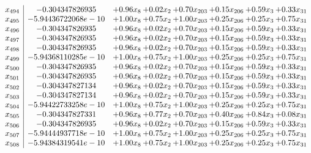 \documentclass[8pt]{article}
\begin{document}
\[\begin{array}{c| c c@{\hskip 2pt} c@{\hskip 2pt} c@{\hskip 2pt} c@{\hskip 2pt} c@{\hskip 2pt} c@{\hskip 2pt} }
 x_{494}   &  -0.304347826935 & +  0.96 x_{8} & +  0.02 x_{2} & +  0.70 x_{203} & +  0.15 x_{206} & +  0.59 x_{3} & +  0.33 x_{31}\\
 x_{495}   &  -5.94436722068e-10 & +  1.00 x_{8} & +  0.75 x_{2} & +  1.00 x_{203} & +  0.25 x_{206} & +  0.25 x_{3} & +  0.75 x_{31}\\
 x_{496}   &  -0.304347826935 & +  0.96 x_{8} & +  0.02 x_{2} & +  0.70 x_{203} & +  0.15 x_{206} & +  0.59 x_{3} & +  0.33 x_{31}\\
 x_{497}   &  -0.304347826935 & +  0.96 x_{8} & +  0.02 x_{2} & +  0.70 x_{203} & +  0.15 x_{206} & +  0.59 x_{3} & +  0.33 x_{31}\\
 x_{498}   &  -0.304347826935 & +  0.96 x_{8} & +  0.02 x_{2} & +  0.70 x_{203} & +  0.15 x_{206} & +  0.59 x_{3} & +  0.33 x_{31}\\
 x_{499}   &  -5.94368110285e-10 & +  1.00 x_{8} & +  0.75 x_{2} & +  1.00 x_{203} & +  0.25 x_{206} & +  0.25 x_{3} & +  0.75 x_{31}\\
 x_{500}   &  -0.304347826935 & +  0.96 x_{8} & +  0.02 x_{2} & +  0.70 x_{203} & +  0.15 x_{206} & +  0.59 x_{3} & +  0.33 x_{31}\\
 x_{501}   &  -0.304347826935 & +  0.96 x_{8} & +  0.02 x_{2} & +  0.70 x_{203} & +  0.15 x_{206} & +  0.59 x_{3} & +  0.33 x_{31}\\
 x_{502}   &  -0.304347827134 & +  0.96 x_{8} & +  0.02 x_{2} & +  0.70 x_{203} & +  0.15 x_{206} & +  0.59 x_{3} & +  0.33 x_{31}\\
 x_{503}   &  -0.304347827134 & +  0.96 x_{8} & +  0.02 x_{2} & +  0.70 x_{203} & +  0.15 x_{206} & +  0.59 x_{3} & +  0.33 x_{31}\\
 x_{504}   &  -5.94422733258e-10 & +  1.00 x_{8} & +  0.75 x_{2} & +  1.00 x_{203} & +  0.25 x_{206} & +  0.25 x_{3} & +  0.75 x_{31}\\
 x_{505}   &  -0.304347827331 & +  0.96 x_{8} & +  0.77 x_{2} & +  0.70 x_{203} & +  0.40 x_{206} & +  0.84 x_{3} & +  0.08 x_{31}\\
 x_{506}   &  -0.304347826935 & +  0.96 x_{8} & +  0.02 x_{2} & +  0.70 x_{203} & +  0.15 x_{206} & +  0.59 x_{3} & +  0.33 x_{31}\\
 x_{507}   &  -5.94444937718e-10 & +  1.00 x_{8} & +  0.75 x_{2} & +  1.00 x_{203} & +  0.25 x_{206} & +  0.25 x_{3} & +  0.75 x_{31}\\
 x_{508}   &  -5.94384319541e-10 & +  1.00 x_{8} & +  0.75 x_{2} & +  1.00 x_{203} & +  0.25 x_{206} & +  0.25 x_{3} & +  0.75 x_{31}\\

\end{array}\]
\end{document}
